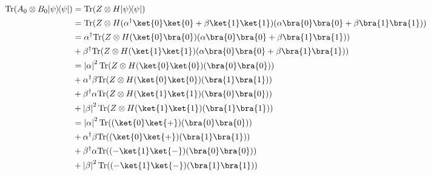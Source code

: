 \documentclass{article}
\newcommand{\ketbra}[2]{|#1\rangle\!\langle #2|}
\newcommand{\trace}{{\rm Tr}}
\newcommand{\abs}[1]{\left\lvert #1 \right\rvert}
\begin{document}
\begin{enumerate}
\begin{enumerate}
                $$\begin{aligned}
                    \trace(A_0\otimes B_0\ketbra{\psi}{\psi}) & = \trace(Z\otimes H\ketbra{\psi}{\psi})                                                                          \\
                                                              & = \trace(Z\otimes H(\alpha^\dagger\ket{0}\ket{0}+\beta\ket{1}\ket{1})(\alpha\bra{0}\bra{0}+\beta\bra{1}\bra{1})) \\
                                                              & = \alpha^\dagger\trace(Z\otimes H(\ket{0}\bra{0})(\alpha\bra{0}\bra{0}+\beta\bra{1}\bra{1}))                     \\
                                                              & + \beta^\dagger\trace(Z\otimes H(\ket{1}\ket{1})(\alpha\bra{0}\bra{0}+\beta\bra{1}\bra{1}))                      \\
                                                              & = \abs{\alpha}^2\trace(Z\otimes H(\ket{0}\ket{0})(\bra{0}\bra{0}))                                               \\
                                                              & + \alpha^\dagger\beta\trace(Z\otimes H(\ket{0}\ket{0})(\bra{1}\bra{1}))                                          \\
                                                              & + \beta^\dagger\alpha\trace(Z\otimes H(\ket{1}\ket{1})(\bra{0}\bra{0}))                                          \\
                                                              & + \abs{\beta}^2\trace(Z\otimes H(\ket{1}\ket{1})(\bra{1}\bra{1}))                                                \\
                                                              & = \abs{\alpha}^2\trace((\ket{0}\ket{+})(\bra{0}\bra{0}))                                                         \\
                                                              & + \alpha^\dagger\beta\trace((\ket{0}\ket{+})(\bra{1}\bra{1}))                                                    \\
                                                              & + \beta^\dagger\alpha\trace((-\ket{1}\ket{-})(\bra{0}\bra{0}))                                                   \\
                                                              & + \abs{\beta}^2\trace((-\ket{1}\ket{-})(\bra{1}\bra{1}))                                                         \\

\end{aligned}$$
\end{enumerate}
\end{enumerate}
\end{document}
